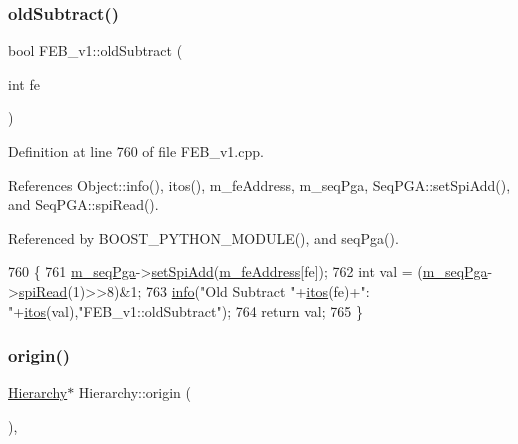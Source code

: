 \subsubsection{\texorpdfstring{old\+Subtract()}{oldSubtract()}}
{\footnotesize\ttfamily bool F\+E\+B\+\_\+v1\+::old\+Subtract (\begin{DoxyParamCaption}\item[{int}]{fe }\end{DoxyParamCaption})}



Definition at line 760 of file F\+E\+B\+\_\+v1.\+cpp.



References Object\+::info(), itos(), m\+\_\+fe\+Address, m\+\_\+seq\+Pga, Seq\+P\+G\+A\+::set\+Spi\+Add(), and Seq\+P\+G\+A\+::spi\+Read().



Referenced by B\+O\+O\+S\+T\+\_\+\+P\+Y\+T\+H\+O\+N\+\_\+\+M\+O\+D\+U\+L\+E(), and seq\+Pga().


\begin{DoxyCode}
760                                 \{
761   \hyperlink{classFEB__v1_a6c7804ac86796f233a8393043adf2e77}{m\_seqPga}->\hyperlink{classSeqPGA_ac998ce3a6d9b5f2e88cc8393f8c1df53}{setSpiAdd}(\hyperlink{classFEB__v1_a4e1945c2d5b434125f375e9d0fc6d99f}{m\_feAddress}[fe]);
762   \textcolor{keywordtype}{int} val = (\hyperlink{classFEB__v1_a6c7804ac86796f233a8393043adf2e77}{m\_seqPga}->\hyperlink{classSeqPGA_ab3d0e5e5d4014bc7a92588a76b8713d4}{spiRead}(1)>>8)&1;
763   \hyperlink{classObject_a644fd329ea4cb85f54fa6846484b84a8}{info}(\textcolor{stringliteral}{"Old Subtract "}+\hyperlink{Tools_8h_af330027dbdafb9a30768b3613c553e60}{itos}(fe)+\textcolor{stringliteral}{": "}+\hyperlink{Tools_8h_af330027dbdafb9a30768b3613c553e60}{itos}(val),\textcolor{stringliteral}{"FEB\_v1::oldSubtract"});
764   \textcolor{keywordflow}{return} val;
765 \}
\end{DoxyCode}
\mbox{\label{classHierarchy_aee461dc930ce3871636ff87f075b1b83}} 
\subsubsection{\texorpdfstring{origin()}{origin()}}
{\footnotesize\ttfamily \hyperlink{classHierarchy}{Hierarchy}$\ast$ Hierarchy\+::origin (\begin{DoxyParamCaption}{ }\end{DoxyParamCaption})\hspace{0.3cm}{\ttfamily [inline]}, {\ttfamily [inherited]}}




